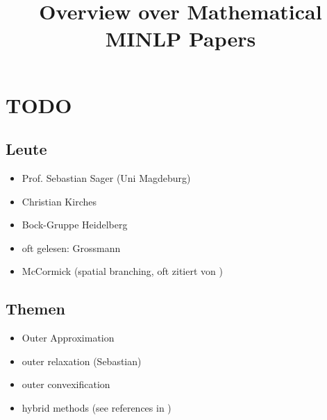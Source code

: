 \documentclass{article}
\title{\textbf{Overview over Mathematical MINLP Papers}}
\begin{document}
\maketitle
\section{TODO}
\subsection{Leute}
\begin{itemize}
\item Prof. Sebastian Sager (Uni Magdeburg)
\item Christian Kirches
\item Bock-Gruppe Heidelberg
\item oft gelesen: Grossmann
\item McCormick (spatial branching, oft zitiert von \cite{burer2012non})
\end{itemize}
\subsection{Themen}
\begin{itemize}
\item Outer Approximation
\item outer relaxation (Sebastian)
\item outer convexification
\item hybrid methods (see references in \cite{burer2012non})
\end{itemize}
\end{document}
